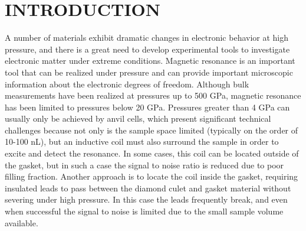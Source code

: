 \documentclass[%
 aip,
 sd,%
 amsmath,amssymb,
 reprint,%
 longbibliography
]{revtex4-1}
\begin{document}
\maketitle

\section{\label{sec:level1}INTRODUCTION}

A number of materials exhibit dramatic changes in electronic behavior at high pressure, and there is a great need to develop experimental tools to investigate electronic matter under extreme conditions. \cite{HeggerRh115discovery,Cambridge122pressure2009,Dias715}  Magnetic resonance is an important tool that can be realized under pressure and can provide important microscopic information about the electronic degrees of freedom.\cite{TakigawaSr122pressure,Lin2015}  Although bulk measurements have been realized at pressures up to 500 GPa,\cite{Dias715} magnetic resonance has been limited to pressures below 20 GPa.\cite{KitagawaPressureCell,HaaseJMR2015}  Pressures greater than 4 GPa can usually only be achieved by anvil cells, which present significant technical challenges because not only is the sample space limited (typically on the order of 10-100 nL), but an inductive coil must also surround the sample in order to excite and detect the resonance.  In some cases, this coil can be located outside of the gasket,\cite{SilveraNMR} but in such a case the signal to noise ratio is reduced due to poor filling fraction.  Another approach is to locate the coil inside the gasket, requiring insulated leads to pass between the diamond culet and gasket material without severing under high pressure.\cite{HaaseJMR2015}  In this case the leads frequently break, and even when successful the signal to noise is limited due to the small sample volume available.
\end{document}
